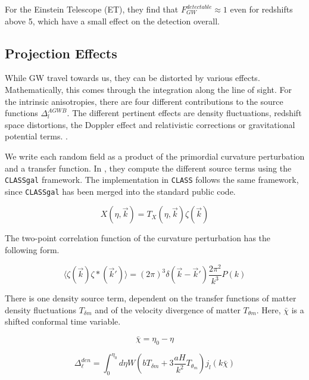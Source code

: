 For the Einstein Telescope (ET), they find that $F_{GW}^{detectable} \approx 1$ even for redshifts above 5, which have a small effect on the detection overall.

\subsection{Projection Effects}
\label{projection_effects}

While GW travel towards us, they can be distorted by various effects. Mathematically, this comes through the integration along the line of sight.
For the intrinsic anisotropies, there are four different contributions to the source functions $\Delta_l^{AGWB}$. The different pertinent effects are density fluctuations, redshift space distortions, the Doppler effect and relativistic corrections or gravitational potential terms. \cite{di_dio_classgal_2013}.

We write each random field as a product of the primordial curvature perturbation and a transfer function. In \cite{dallarmi_dipole_2022}, they compute the different source terms using the {\tt CLASSgal} framework. The implementation in {\tt CLASS} follows the same framework, since {\tt CLASSgal} has been merged into the standard public code.

\begin{equation}
    X(\eta, \vec{k}) = T_X(\eta, \vec{k})\zeta(\vec{k})
\end{equation}

The two-point correlation function of the curvature perturbation has the following form.

\begin{equation}
    \langle \zeta(\vec{k})\zeta*(\vec{k}')\rangle = (2\pi)^3 \delta(\vec{k}-\vec{k}')\frac{2\pi^2}{k^3}P(k)
\end{equation}

There is one density source term, dependent on the transfer functions of matter density fluctuations $T_{\delta m}$ and of the velocity divergence of matter $T_{\theta m}$. Here, $\bar{\chi}$ is a shifted conformal time variable.

\begin{equation}
    \bar{\chi} = \eta_0 - \eta 
\end{equation}


\begin{equation}
    \Delta_\ell^{den}=\int_0^{\eta_0} d\eta W \left(b T_{\delta m} +3 \frac{aH}{k^2} T_{\theta_m}\right)j_l(k \bar{\chi})
\end{equation}

